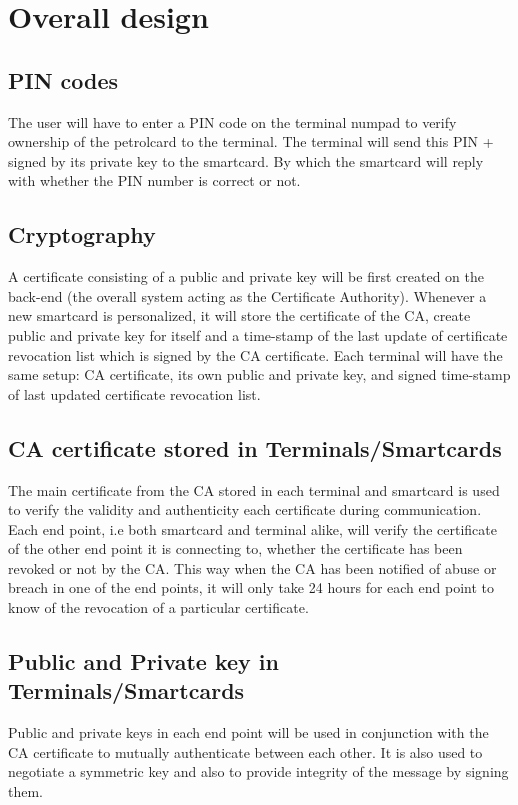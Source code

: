 \section{Overall design}
\subsection{PIN codes}
The user will have to enter a PIN code on the terminal numpad to verify ownership of the petrolcard to the terminal. The terminal will send this PIN + signed by its private key to the smartcard. By which the smartcard will reply with whether the PIN number is correct or not.

\subsection{Cryptography}
A certificate consisting of a public and private key will be first created on the back-end (the overall system acting as the Certificate Authority). Whenever a new smartcard is personalized, it will store the certificate of the CA, create public and private key for itself and a time-stamp of the last update of certificate revocation list which is signed by the CA certificate. Each terminal will have the same setup: CA certificate, its own public and private key, and signed time-stamp of last updated certificate revocation list.

\subsection{CA certificate stored in Terminals/Smartcards}
The main certificate from the CA stored in each terminal and smartcard is used to verify the validity and authenticity each certificate during communication. Each end point, i.e both smartcard and terminal alike, will verify the certificate of the other end point it is connecting to, whether the certificate has been revoked or not by the CA. This way when the CA has been notified of abuse or breach in one of the end points, it will only take 24 hours for each end point to know of the revocation of a particular certificate.

\subsection{Public and Private key in Terminals/Smartcards}
Public and private keys in each end point will be used in conjunction with the CA certificate to mutually authenticate between each other. It is also used to negotiate a symmetric key and also to provide integrity of the message by signing them.

